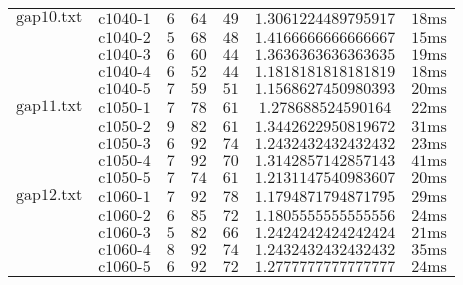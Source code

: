\begin{tabular}{ccccccc}
    $\text{gap10.txt}$ & $\text{c1040-1}$ & $6$      & $64$          & $49$       & $1.3061224489795917$             & $\text{18ms}$ \\
    & $\text{c1040-2}$ & $5$      & $68$          & $48$       & $1.4166666666666667$             & $\text{15ms}$ \\
    & $\text{c1040-3}$ & $6$      & $60$          & $44$       & $1.3636363636363635$             & $\text{19ms}$ \\
    & $\text{c1040-4}$ & $6$      & $52$          & $44$       & $1.1818181818181819$             & $\text{18ms}$ \\
    & $\text{c1040-5}$ & $7$      & $59$          & $51$       & $1.1568627450980393$             & $\text{20ms}$ \\ \hline
    $\text{gap11.txt}$ & $\text{c1050-1}$ & $7$      & $78$          & $61$       & $1.278688524590164$              & $\text{22ms}$ \\
    & $\text{c1050-2}$ & $9$      & $82$          & $61$       & $1.3442622950819672$             & $\text{31ms}$ \\
    & $\text{c1050-3}$ & $6$      & $92$          & $74$       & $1.2432432432432432$             & $\text{23ms}$ \\
    & $\text{c1050-4}$ & $7$      & $92$          & $70$       & $1.3142857142857143$             & $\text{41ms}$ \\
    & $\text{c1050-5}$ & $7$      & $74$          & $61$       & $1.2131147540983607$             & $\text{20ms}$ \\ \hline
    $\text{gap12.txt}$ & $\text{c1060-1}$ & $7$      & $92$          & $78$       & $1.1794871794871795$             & $\text{29ms}$ \\
    & $\text{c1060-2}$ & $6$      & $85$          & $72$       & $1.1805555555555556$             & $\text{24ms}$ \\
    & $\text{c1060-3}$ & $5$      & $82$          & $66$       & $1.2424242424242424$             & $\text{21ms}$ \\
    & $\text{c1060-4}$ & $8$      & $92$          & $74$       & $1.2432432432432432$             & $\text{35ms}$ \\
    & $\text{c1060-5}$ & $6$      & $92$          & $72$       & $1.2777777777777777$             & $\text{24ms}$
\end{tabular}
